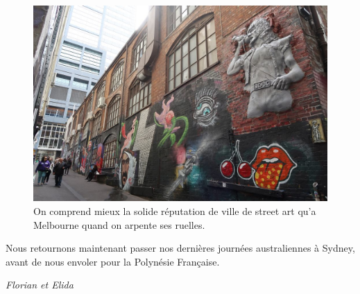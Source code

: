 \begin{figure}
\centering
\includegraphics{images/20180731_melbourne.JPG}
\caption{On comprend mieux la solide réputation de ville de street art
qu'a Melbourne quand on arpente ses ruelles.}
\end{figure}

Nous retournons maintenant passer nos dernières journées australiennes à
Sydney, avant de nous envoler pour la Polynésie Française.

\emph{Florian et Elida}
